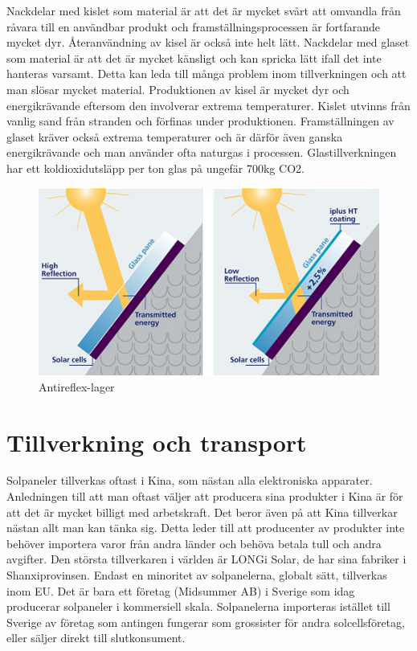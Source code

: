 \documentclass{article}
\begin{document}
Nackdelar med kislet som material är att det är mycket svårt att omvandla från råvara till en användbar produkt och framställningsprocessen är fortfarande mycket dyr. Återanvändning av kisel är också inte helt lätt.
Nackdelar med glaset som material är att det är mycket känsligt och kan spricka lätt ifall det inte hanteras varsamt. Detta kan leda till många problem inom tillverkningen och att man slösar mycket material.
\pagebreak
Produktionen av kisel är mycket dyr och energikrävande eftersom den involverar extrema temperaturer. Kislet utvinns från vanlig sand från stranden och förfinas under produktionen. 
Framställningen av glaset kräver också extrema temperaturer och är därför även ganska energikrävande och man använder ofta naturgas i processen. Glastillverkningen har ett koldioxidutsläpp per ton glas på ungefär 700kg CO2.

\begin{figure}[h]
	\centering
	\includegraphics[width=\linewidth]{reflexcoat}
	\caption{Antireflex-lager}
	\label{fig:refl1}
\end{figure}
\pagebreak
\section{Tillverkning och transport}
Solpaneler tillverkas oftast i Kina, som nästan alla elektroniska apparater. Anledningen till att man oftast väljer att producera sina produkter i Kina är för att det är mycket billigt med arbetskraft. Det beror även på att Kina tillverkar nästan allt man kan tänka sig. Detta leder till att producenter av produkter inte behöver importera varor från andra länder och behöva betala tull och andra avgifter. Den största tillverkaren i världen är LONGi Solar, de har sina fabriker i Shanxiprovinsen. 
Endast en minoritet av solpanelerna, globalt sätt, tillverkas inom EU.
Det är bara ett företag (Midsummer AB) i Sverige som idag producerar solpaneler i kommersiell skala. Solpanelerna importeras istället till Sverige av företag som antingen fungerar som grossister för andra solcellsföretag, eller säljer direkt till slutkonsument.
\end{document}
